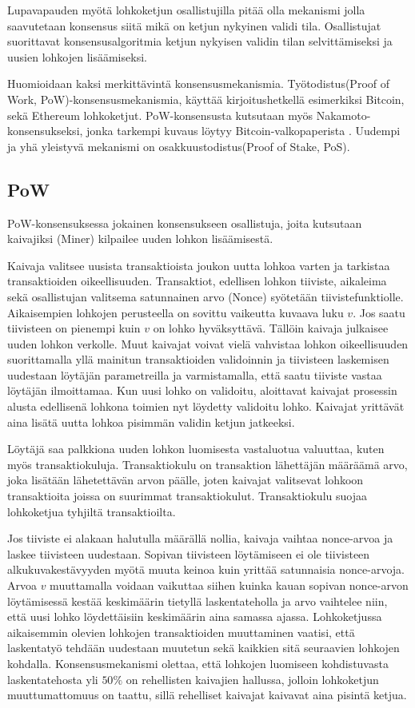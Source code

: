  Lupavapauden myötä lohkoketjun osallistujilla pitää olla mekanismi jolla saavutetaan konsensus siitä mikä on ketjun nykyinen validi tila. Osallistujat suorittavat konsensusalgoritmia ketjun nykyisen validin tilan selvittämiseksi ja uusien lohkojen lisäämiseksi. 

Huomioidaan kaksi merkittävintä konsensusmekanismia. Työtodistus(Proof of Work, PoW)-konsensusmekanismia, käyttää kirjoitushetkellä esimerkiksi Bitcoin, sekä Ethereum lohkoketjut. PoW-konsensusta kutsutaan myös Nakamoto-konsensukseksi, jonka tarkempi kuvaus löytyy Bitcoin-valkopaperista \cite{Nakamoto_bitcoin}. Uudempi ja yhä yleistyvä mekanismi on  osakkuustodistus(Proof of Stake, PoS). 

\subsection{PoW}
PoW-konsensuksessa jokainen konsensukseen osallistuja, joita kutsutaan kaivajiksi (Miner) kilpailee uuden lohkon lisäämisestä.

Kaivaja valitsee uusista transaktioista joukon uutta lohkoa varten ja tarkistaa transaktioiden oikeellisuuden. Transaktiot, edellisen lohkon tiiviste, aikaleima sekä osallistujan valitsema satunnainen arvo (Nonce) syötetään tiivistefunktiolle. Aikaisempien lohkojen perusteella on sovittu vaikeutta kuvaava luku $v$. Jos saatu tiivisteen on pienempi kuin $v$ on lohko hyväksyttävä. Tällöin kaivaja julkaisee uuden lohkon verkolle. Muut kaivajat voivat vielä vahvistaa lohkon oikeellisuuden suorittamalla yllä mainitun transaktioiden validoinnin ja tiivisteen laskemisen uudestaan löytäjän parametreilla ja varmistamalla, että saatu tiiviste vastaa löytäjän ilmoittamaa. Kun uusi lohko on validoitu, aloittavat kaivajat prosessin alusta edellisenä lohkona toimien nyt löydetty validoitu lohko. Kaivajat yrittävät aina lisätä uutta lohkoa pisimmän validin ketjun jatkeeksi. 

Löytäjä saa palkkiona uuden lohkon luomisesta vastaluotua valuuttaa, kuten myös transaktiokuluja. Transaktiokulu on transaktion lähettäjän määräämä arvo, joka lisätään lähetettävän arvon päälle, joten kaivajat valitsevat lohkoon transaktioita joissa on suurimmat transaktiokulut. Transaktiokulu suojaa lohkoketjua tyhjiltä transaktioilta.

Jos tiiviste ei alakaan halutulla määrällä nollia, kaivaja vaihtaa nonce-arvoa ja laskee tiivisteen uudestaan. Sopivan tiivisteen löytämiseen ei ole tiivisteen alkukuvakestävyyden myötä muuta keinoa kuin yrittää satunnaisia nonce-arvoja. Arvoa $v$ muuttamalla voidaan vaikuttaa siihen kuinka kauan sopivan nonce-arvon löytämisessä kestää keskimäärin tietyllä laskentateholla ja arvo vaihtelee niin, että uusi lohko löydettäisiin keskimäärin aina samassa ajassa. Lohkoketjussa aikaisemmin olevien lohkojen transaktioiden muuttaminen vaatisi, että laskentatyö tehdään uudestaan muutetun sekä kaikkien sitä seuraavien lohkojen kohdalla. Konsensusmekanismi olettaa, että lohkojen luomiseen kohdistuvasta laskentatehosta yli $50\%$ on rehellisten kaivajien hallussa, jolloin lohkoketjun muuttumattomuus on taattu, sillä rehelliset kaivajat kaivavat aina pisintä ketjua.

